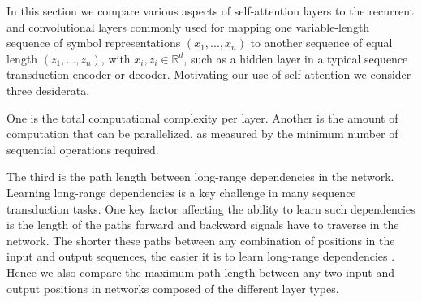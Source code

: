 
In this section we compare various aspects of self-attention layers to the recurrent and convolutional layers commonly used for mapping one variable-length sequence of symbol representations $(x_1, ..., x_n)$ to another sequence of equal length $(z_1, ..., z_n)$, with $x_i, z_i \in \mathbb{R}^d$, such as a hidden layer in a typical sequence transduction encoder or decoder. Motivating our use of self-attention we consider three desiderata.

One is the total computational complexity per layer.
Another is the amount of computation that can be parallelized, as measured by the minimum number of sequential operations required.

The third is the path length between long-range dependencies in the network. Learning long-range dependencies is a key challenge in many sequence transduction tasks. One key factor affecting the ability to learn such dependencies is the length of the paths forward and backward signals have to traverse in the network. The shorter these paths between any combination of positions in the input and output sequences, the easier it is to learn long-range dependencies \citep{hochreiter2001gradient}. Hence we also compare the maximum path length between any two input and output positions in networks composed of the different layer types.


